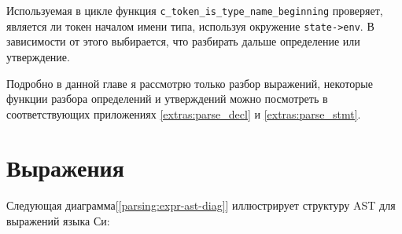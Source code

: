 Используемая в цикле функция \verb|c_token_is_type_name_beginning| проверяет, является ли токен началом имени типа, используя окружение \verb|state->env|.
В зависимости от этого выбирается, что разбирать дальше определение или утверждение.

Подробно в данной главе я рассмотрю только разбор выражений, некоторые функции разбора определений и утверждений можно посмотреть в соответствующих приложениях \ref{extras:parse_decl} и \ref{extras:parse_stmt}.






\clearpage
\section{Выражения}

Следующая диаграмма[\ref{parsing:expr-ast-diag}] иллюстрирует структуру AST для выражений языка Си: 


